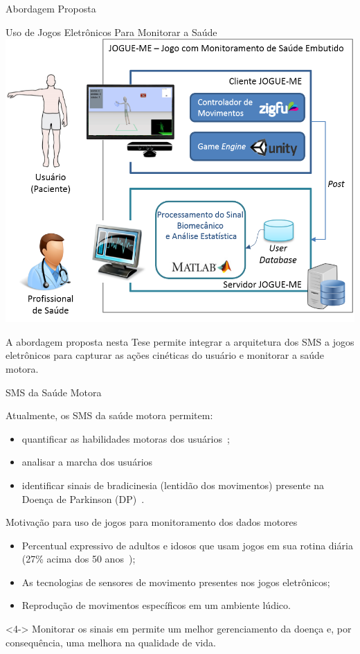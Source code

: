 \documentclass{beamer}
\begin{document}
\begin{frame}{Abordagem Proposta}
  \begin{block}{Uso de Jogos Eletrônicos Para Monitorar a Saúde}
      \center \includegraphics[height=1.8 in]{img/visaosistema.png}
  \end{block}
  \begin{block}{ }
A abordagem proposta nesta Tese permite integrar a arquitetura dos SMS a jogos eletrônicos para capturar as ações cinéticas do usuário e monitorar a saúde motora. 
  \end{block}
\end{frame}



\begin{frame}{SMS da Saúde Motora}  
  \begin{block}{}  
  Atualmente, os SMS da saúde motora permitem:  
    \begin{itemize}[<+->]
    \item quantificar as habilidades motoras dos usuários~\cite{manumeterjbhi2014,patel_monitoring_2009};
    \item analisar a marcha dos usuários~\cite{robotgait2014}
    \item identificar sinais de bradicinesia (lentidão dos movimentos) presente na Doença de Parkinson (DP)~\cite{ambulatoryparkinson2010}. 
    \end{itemize}   
  \end{block}   
\end{frame}




\begin{frame}{Motivação para uso de jogos para monitoramento dos dados motores}
	\begin{block}{}
	\begin{itemize}[<+->]
	    \item Percentual expressivo de adultos e idosos que usam jogos em sua rotina diária (27\% acima dos 50 anos~\cite{esa2015});
	    \item As tecnologias de sensores de movimento presentes nos jogos eletrônicos;
	    \item Reprodução de movimentos específicos em um ambiente lúdico.
	\end{itemize}
	\end{block}
	
	\begin{alertblock}{}<4->
	Monitorar os sinais em permite um melhor gerenciamento da doença e, por consequência, uma melhora na qualidade de vida.
	\end{alertblock}
\end{frame}
\end{document}
